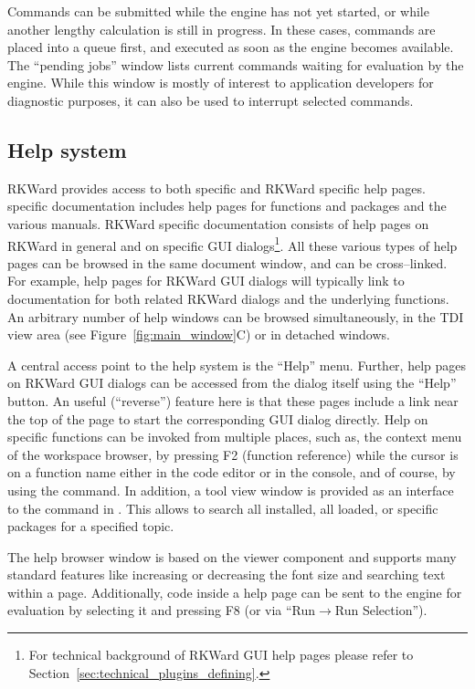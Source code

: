 Commands can be submitted while the  engine
has not yet started, or while another lengthy calculation is still
in progress. In these cases, commands are placed into a queue first, and
executed as soon as the  engine becomes
available. The ``pending jobs'' window lists current  commands waiting for
evaluation by the  engine. While this
window is mostly of interest to application developers for diagnostic
purposes, it can also be used to interrupt selected commands.

\subsection{Help system}
\label{sec:help_system}

RKWard provides access to both  specific and 
RKWard specific help pages.
 specific documentation includes help pages for functions and packages 
and the various  manuals. RKWard specific documentation consists of
help pages on RKWard in general and on specific GUI dialogs\footnote{For technical 
background of RKWard GUI help pages please refer to Section~\ref{sec:technical_plugins_defining}.}. 
All these various types of help pages can be browsed in the same document 
window, and can be cross--linked. For example, help pages for
RKWard GUI dialogs will typically link to documentation for both
related RKWard dialogs and the underlying  functions.
An arbitrary number of help windows can be browsed simultaneously, in the
TDI view area (see Figure~\ref{fig:main_window}C) or in detached windows.

A central access point to the help system is the ``Help'' menu. Further, help pages on
RKWard GUI dialogs can be accessed from the dialog itself using the
``Help'' button. An useful (``reverse'') feature here is that these pages include 
a link near the top of the page to start the corresponding GUI dialog directly.
Help on  specific functions can be invoked from multiple places, 
such as, the context menu of the workspace browser, by pressing F2 (function
reference) while the cursor is on a function name either in the code editor or 
in the  console, and of course, by using the  
command. In addition, a tool view window is provided as an interface to the
 command in . This allows to search all installed, 
all loaded, or specific  packages for a specified topic.

The help browser window is based on the 
 viewer component and supports many standard
features like increasing or decreasing the font size and searching text
within a page. Additionally,  code inside a help
page can be sent to the  engine for
evaluation by selecting it and pressing F8 (or via ``Run$\rightarrow$Run
Selection'').

